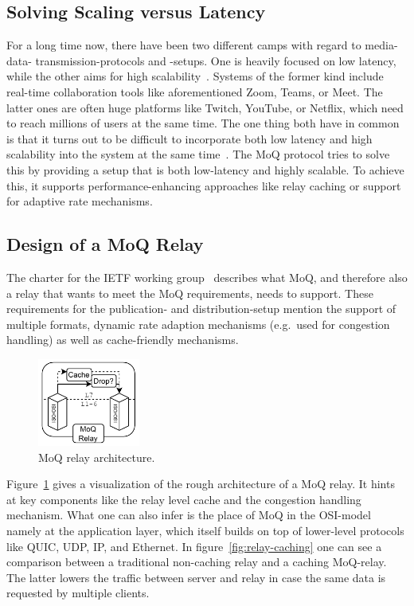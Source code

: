 \subsection{Solving Scaling versus Latency}
For a long time now, there have been two different camps with regard to media-data-
transmission-protocols and -setups.
One is heavily focused on low latency, while the other aims for high scalability~\parencite{what-is-moq}.
Systems of the former kind include real-time collaboration tools like aforementioned Zoom, Teams, or Meet.
The latter ones are often huge platforms like Twitch, YouTube, or Netflix, which need to 
reach millions of users at the same time.
The one thing both have in common is that it turns out to be difficult to incorporate both 
low latency and high scalability into the system at the same time~\parencite{what-is-moq}.
The MoQ protocol tries to solve this by providing a setup that is both low-latency and
highly scalable.
To achieve this, it supports performance-enhancing approaches like relay caching or support 
for adaptive rate mechanisms. %

\subsection{Design of a MoQ Relay}
The charter for the IETF working group~\parencite{moq-charter} describes what MoQ, and therefore also a relay 
that wants to meet the MoQ requirements, needs to support.
These requirements for the publication- and distribution-setup mention the support of 
multiple formats, dynamic rate adaption mechanisms (e.g.~used for congestion handling)
as well as cache-friendly mechanisms.

\begin{figure}[H]
    \centering
    \includegraphics[width=0.3\textwidth]{figures/02_background/moq-relay.drawio.pdf}
    \caption[MoQ relay architecture]{MoQ relay architecture.}\label{fig:moq-relay-architecture}
\end{figure}

Figure~\ref{fig:moq-relay-architecture} gives a visualization of the rough architecture
of a MoQ relay.
It hints at key components like the relay level cache and the congestion handling
mechanism.
What one can also infer is the place of MoQ in the OSI-model namely at the application
layer, which itself builds on top of lower-level protocols like QUIC, UDP, IP, and Ethernet.
In figure~\ref{fig:relay-caching} one can see a comparison between a traditional non-caching
relay and a caching MoQ-relay.
The latter lowers the traffic between server and relay in case the same data is requested
by multiple clients.

